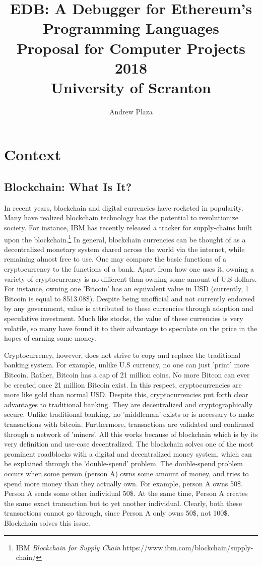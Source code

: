 \documentclass[]{article}
\title{%
	EDB: A Debugger for Ethereum's Programming Languages \\
	\bigskip	
	\bigskip									
	\large	Proposal for Computer Projects 2018 \\
	\large University of Scranton}
\author{Andrew Plaza}
\begin{document}
\maketitle
\newpage
\tableofcontents
\newpage

\section{Context}
\subsection{Blockchain: What Is It?}

In recent years, blockchain and digital currencies have rocketed in popularity. Many have realized blockchain technology has the potential to revolutionize society. For instance, IBM has recently released a tracker for supply-chains built upon the blockchain.\footnote{IBM \textit{Blockchain for Supply Chain} https://www.ibm.com/blockchain/supply-chain/} In general, blockchain currencies can be thought of as a decentralized monetary system shared across the world via the internet, while remaining almost free to use. One may compare the basic functions of a cryptocurrency to the functions of a bank. Apart from how one uses it, owning a variety of cryptocurrency is no different than owning some amount of U.S dollars. For instance, owning one 'Bitcoin' has an equivalent value in USD (currently, 1 Bitcoin is equal to 8513.08\$). Despite being unofficial and not currently endorsed by any government, value is attributed to these currencies through adoption and speculative investment. Much like stocks, the value of these currencies is very volatile, so many have found it to their advantage to speculate on the price in the hopes of earning some money.

Cryptocurrency, however, does not strive to copy and replace the traditional banking system. For example, unlike U.S currency, no one can just 'print' more Bitcoin. Rather, Bitcoin has a cap of 21 million coins. No more Bitcon can ever be created once 21 million Bitcoin exist. In this respect, cryptocurrencies are more like gold than normal USD. Despite this, cryptocurrencies put forth clear advantages to traditional banking. They are decentralized and cryptographically secure. Unlike traditional banking, no 'middleman' exists or is necessary to make transactions with bitcoin. Furthermore, transactions are validated and confirmed through a network of 'miners'. All this works because of blockchain which is by its very definition and use-case decentralized. The blockchain solves one of the most prominent roadblocks with a digital and decentralized money system, which can be explained through the 'double-spend' problem. The double-spend problem occurs when some person (person A) owns some amount of money, and tries to spend more money than they actually own. For example, person A owns 50\$. Person A sends some other individual 50\$. At the same time, Person A creates the same exact transaction but to yet another individual. Clearly, both these transactions cannot go through, since Person A only owns 50\$, not 100\$. Blockchain solves this issue.
\end{document}
